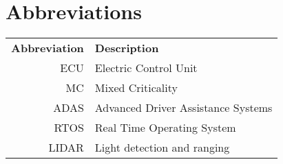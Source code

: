 \chapter*{Abbreviations}
\noindent{}\begin{tabular}{r  l}
\textbf{Abbreviation} 	& \textbf{Description} \vspace{.5em} \\
ECU		&Electric Control Unit\\
MC		&Mixed Criticality\\
ADAS	&Advanced Driver Assistance Systems\\
RTOS	&Real Time Operating System\\
LIDAR	&Light detection and ranging\\
\end{tabular}